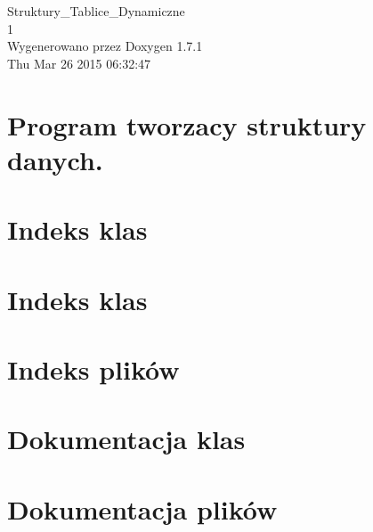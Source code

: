 \documentclass[a4paper]{book}
\begin{document}
\hypersetup{pageanchor=false}
\begin{titlepage}
\vspace*{7cm}
\begin{center}
{\Large Struktury\_\-Tablice\_\-Dynamiczne \\[1ex]\large 1 }\\
\vspace*{1cm}
{\large Wygenerowano przez Doxygen 1.7.1}\\
\vspace*{0.5cm}
{\small Thu Mar 26 2015 06:32:47}\\
\end{center}
\end{titlepage}
\clearemptydoublepage
{}
\tableofcontents
\clearemptydoublepage
{}
\hypersetup{pageanchor=true}
\chapter{Program tworzacy struktury danych.}
\label{index}\hypertarget{index}{}
\chapter{Indeks klas}

\chapter{Indeks klas}

\chapter{Indeks plików}

\chapter{Dokumentacja klas}




\chapter{Dokumentacja plików}









\printindex
\end{document}
